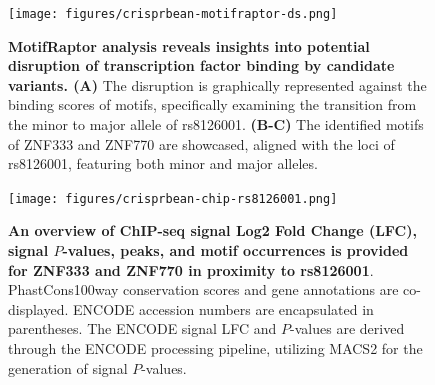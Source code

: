 \documentclass[a4paper, titlepage, openright]{book}
\newcommand{\motifraptor}{MotifRaptor\xspace}
\begin{document}
\begin{figure}[!]
	\centering
	\texttt{[image: figures/crisprbean-motifraptor-ds.png]}
	\caption[\motifraptor analysis reveals insights into potential disruption of transcription factor binding by candidate variants]{\textbf{\motifraptor analysis reveals insights into potential disruption of transcription factor binding by candidate variants. (A)} The disruption is graphically represented against the binding scores of motifs, specifically examining the transition from the minor to major allele of rs8126001. \textbf{(B-C)} The identified motifs of ZNF333 and ZNF770 are showcased, aligned with the loci of rs8126001, featuring both minor and major alleles.}
	\label{fig:crisprbean-motifraptor-ds}
\end{figure}

\begin{figure}[!]
	\centering
	\texttt{[image: figures/crisprbean-chip-rs8126001.png]}
	\caption[An overview of ChIP-seq signal Log2 Fold Change (LFC), signal $P$-values, peaks, and motif occurrences is provided for ZNF333 and ZNF770 in proximity to rs8126001]{\textbf{An overview of ChIP-seq signal Log2 Fold Change (LFC), signal $P$-values, peaks, and motif occurrences is provided for ZNF333 and ZNF770 in proximity to rs8126001}. PhastCons100way conservation scores and gene annotations are co-displayed. ENCODE accession numbers are encapsulated in parentheses. The ENCODE signal LFC and $P$-values are derived through the ENCODE processing pipeline, utilizing MACS2 \citep{zhang2008model} for the generation of signal $P$-values.}
	\label{fig:crisprbean-chip-variant}
\end{figure} 


\end{document}
